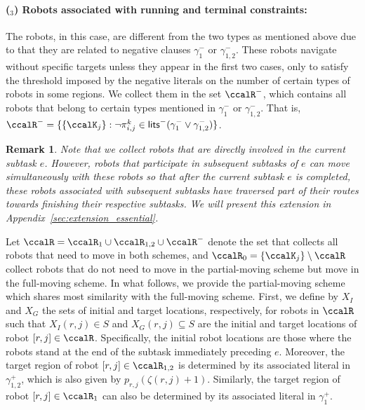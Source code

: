 \documentclass[Afour,sageh,times]{sagej}
\newtheorem{rem}[thm]{Remark}
\newcounter{mycounter}
\renewcommand{\ap}[3]{\mathcal{\pi}_{{#1},{#2}}^{#3}}
\begin{document}
{{ \paragraph{($_3$) Robots associated with running and terminal constraints:}\label{sec:essential_c} The robots, in this case, are different from the two types as mentioned above due to that they are related to negative clauses $\gamma_1^-$ or $\gamma_{1,2}^-$. These robots navigate without specific targets unless they appear in the first two cases, only to satisfy the threshold imposed by the negative literals on the number of certain types of robots in some regions. We collect them in the set $\ccalR^-$, which contains all robots that belong to certain types mentioned in $\gamma_1^-$ or $\gamma_{1,2}^-$. That is, $\ccalR^- = \{\{\ccalK_j\}: \neg \ap{i}{j}{k} \in \mathsf{lits}^- (\gamma_1^-  \vee \gamma_{1,2}^-) \}$.


 \begin{rem}
  Note that we collect robots that are directly involved in the current subtask $e$. However, robots that participate in subsequent subtasks of $e$ can move simultaneously with these robots so that after the current subtask $e$ is completed, these robots associated with subsequent subtasks have traversed part of their routes towards finishing their respective subtasks. We will present this extension in Appendix~\ref{sec:extension_essential}.
 \end{rem}

Let $\ccalR = \ccalR_1 \cup\ccalR_{1,2}  \cup \ccalR^-$ denote the set that collects all robots that need to move in both schemes, and $\ccalR_0 = \{\ccalK_j\}\setminus\ccalR$ collect robots that do not need to move in the partial-moving scheme but move in the full-moving scheme. In what follows, we provide the partial-moving scheme which shares most similarity with the full-moving scheme. First, we define by $X_I$ and $X_G$ the sets of initial and target locations, respectively, for robots in $\ccalR$  such that $X_I(r,j) \in S$ and $X_G(r,j)\subseteq S$ are the initial  and target locations of robot $[r,j] \in \ccalR$. Specifically, the initial robot locations are those where the robots stand at the end of the subtask immediately preceding $e$. Moreover, the target region of  robot $[r,j] \in \ccalR_{1,2}$ is determined  by its associated literal in $\gamma_{1,2}^+$, which is also given by  $p_{r,j}(\zeta(r,j)+1)$. Similarly, the target region of robot $[r,j] \in \ccalR_{1}$ can also be determined by its associated literal in $\gamma_1^+$. %

}}
\end{document}
